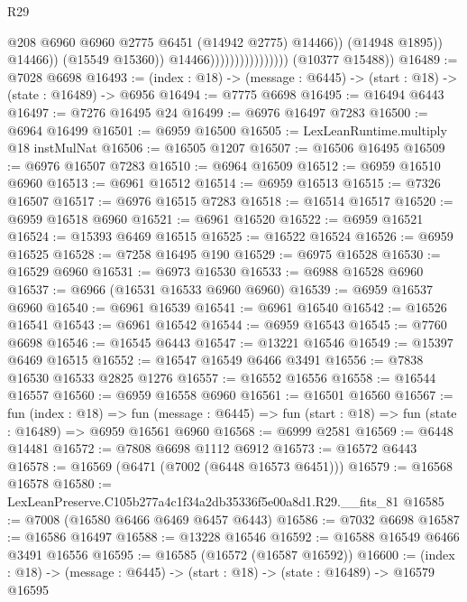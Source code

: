 \begin{lexlean}{R29}
\begin{coremodule}
                                                  @208
                                                  @6960
                                                  @6960
                                                  @2775
                                                  @6451
                                                  (@14942 @2775)
                                                  @14466))
                                              (@14948 @1895))
                                            @14466))
                                        (@15549 @15360))
                                      @14466))))))))))))))))
      (@10377 @15488))
@16489 := @7028 @6698
@16493 := (index : @18) -> (message : @6445) -> (start : @18) -> (state : @16489) -> @6956
@16494 := @7775 @6698
@16495 := @16494 @6443
@16497 := @7276 @16495 @24
@16499 := @6976 @16497 @7283
@16500 := @6964 @16499
@16501 := @6959 @16500
@16505 := LexLeanRuntime.multiply @18 instMulNat
@16506 := @16505 @1207
@16507 := @16506 @16495
@16509 := @6976 @16507 @7283
@16510 := @6964 @16509
@16512 := @6959 @16510 @6960
@16513 := @6961 @16512
@16514 := @6959 @16513
@16515 := @7326 @16507
@16517 := @6976 @16515 @7283
@16518 := @16514 @16517
@16520 := @6959 @16518 @6960
@16521 := @6961 @16520
@16522 := @6959 @16521
@16524 := @15393 @6469 @16515
@16525 := @16522 @16524
@16526 := @6959 @16525
@16528 := @7258 @16495 @190
@16529 := @6975 @16528
@16530 := @16529 @6960
@16531 := @6973 @16530
@16533 := @6988 @16528 @6960
@16537 := @6966 (@16531 @16533 @6960 @6960)
@16539 := @6959 @16537 @6960
@16540 := @6961 @16539
@16541 := @6961 @16540
@16542 := @16526 @16541
@16543 := @6961 @16542
@16544 := @6959 @16543
@16545 := @7760 @6698
@16546 := @16545 @6443
@16547 := @13221 @16546
@16549 := @15397 @6469 @16515
@16552 := @16547 @16549 @6466 @3491
@16556 := @7838 @16530 @16533 @2825 @1276
@16557 := @16552 @16556
@16558 := @16544 @16557
@16560 := @6959 @16558 @6960
@16561 := @16501 @16560
@16567 := fun (index : @18) =>
  fun (message : @6445) => fun (start : @18) => fun (state : @16489) => @6959 @16561 @6960
@16568 := @6999 @2581
@16569 := @6448 @14481
@16572 := @7808 @6698 @1112 @6912
@16573 := @16572 @6443
@16578 := @16569 (@6471 (@7002 (@6448 @16573 @6451)))
@16579 := @16568 @16578
@16580 := LexLeanPreserve.C105b277a4c1f34a2db35336f5e00a8d1.R29.__fits_81
@16585 := @7008 (@16580 @6466 @6469 @6457 @6443)
@16586 := @7032 @6698
@16587 := @16586 @16497
@16588 := @13228 @16546
@16592 := @16588 @16549 @6466 @3491 @16556
@16595 := @16585 (@16572 (@16587 @16592))
@16600 := (index : @18) -> (message : @6445) -> (start : @18) -> (state : @16489) -> @16579 @16595

\end{coremodule}
\end{lexlean}

